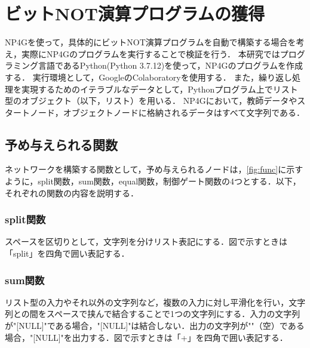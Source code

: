 \documentclass[exploratorypaper]{jsaiart} %
\begin{document}
\section{ビットNOT演算プログラムの獲得}
NP4Gを使って，具体的にビットNOT演算プログラムを自動で構築する場合を考え，実際にNP4Gのプログラムを実行することで検証を行う．
本研究ではプログラミング言語であるPython(Python 3.7.12)を使って，NP4Gのプログラムを作成する．
実行環境として，GoogleのColaboratoryを使用する．
また，繰り返し処理を実現するためのイテラブルなデータとして，Pythonプログラム上でリスト型のオブジェクト（以下，リスト）を用いる．
NP4Gにおいて，教師データやスタートノード，オブジェクトノードに格納されるデータはすべて文字列である．

\subsection{予め与えられる関数}
ネットワークを構築する関数として，予め与えられるノードは，\ref{fig:func}に示すように，split関数，sum関数，equal関数，制御ゲート関数の4つとする．以下，それぞれの関数の内容を説明する．
\subsubsection{split関数}
スペースを区切りとして，文字列を分けリスト表記にする．図で示すときは「split」を四角で囲い表記する．


\subsubsection{sum関数}
リスト型の入力やそれ以外の文字列など，複数の入力に対し平滑化を行い，文字列との間をスペースで挟んで結合することで1つの文字列にする．入力の文字列が"[NULL]"である場合，"[NULL]"は結合しない．出力の文字列が""（空）である場合，"[NULL]"を出力する．図で示すときは「+」を四角で囲い表記する．
\end{document}
